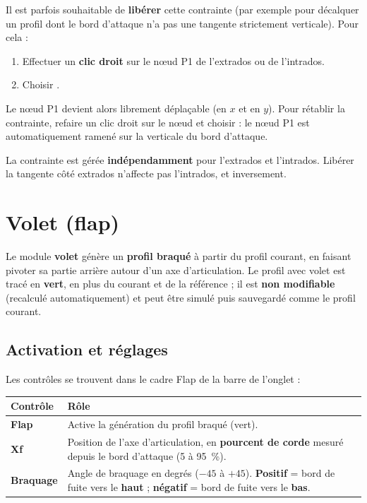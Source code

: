 Il est parfois souhaitable de \textbf{libérer} cette contrainte (par
exemple pour décalquer un profil dont le bord d'attaque n'a pas une
tangente strictement verticale). Pour cela :

\begin{enumerate}
    \item Effectuer un \textbf{clic droit} sur le nœud P1 de
        l'extrados ou de l'intrados.
    \item Choisir .
\end{enumerate}

Le nœud P1 devient alors librement déplaçable (en $x$ et en $y$).
Pour rétablir la contrainte, refaire un clic droit sur le nœud et
choisir  :
le nœud P1 est automatiquement ramené sur la verticale du bord
d'attaque.

\begin{noteinfo}
La contrainte est gérée \textbf{indépendamment} pour l'extrados et
l'intrados. Libérer la tangente côté extrados n'affecte pas
l'intrados, et inversement.
\end{noteinfo}

\section{Volet (flap)}
\label{sec:flap}

Le module \textbf{volet} génère un \textbf{profil braqué} à partir
du profil courant, en faisant pivoter sa partie arrière autour d'un
axe d'articulation. Le profil avec volet est tracé en
\textbf{vert}, en plus du courant et de la référence ; il est
\textbf{non modifiable} (recalculé automatiquement) et peut être
simulé puis sauvegardé comme le profil courant.


\subsection{Activation et réglages}

Les contrôles se trouvent dans le cadre \og Flap \fg{} de la barre
de l'onglet  :

\begin{tabularx}{\linewidth}{l X}
    \toprule
    \textbf{Contrôle} & \textbf{Rôle} \\
    \midrule
    \textbf{Flap} & Active la génération du profil braqué (vert). \\
    \textbf{Xf} & Position de l'axe d'articulation, en \textbf{pourcent
        de corde} mesuré depuis le bord d'attaque (5 à 95~\%). \\
    \textbf{Braquage} & Angle de braquage en degrés ($-45$ à
        $+45$). \textbf{Positif} = bord de fuite vers le \textbf{haut} ;
        \textbf{négatif} = bord de fuite vers le \textbf{bas}. \\
    \bottomrule
\end{tabularx}


